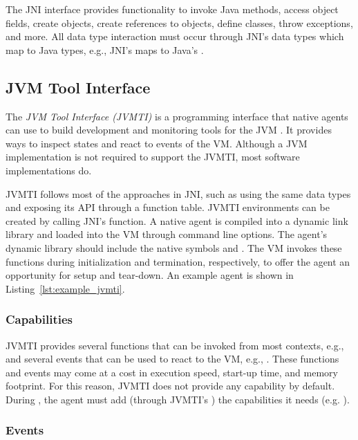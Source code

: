 The JNI interface provides functionality to invoke Java methods, access object fields, create objects, create references to objects, define classes, throw exceptions, and more. All data type interaction must occur through JNI's data types which map to Java types, e.g., JNI's  maps to Java's .

\subsection{JVM Tool Interface}

The \emph{JVM Tool Interface (JVMTI)} is a programming interface that native agents can use to build development and monitoring tools for the JVM \cite{jvmti}. It provides ways to inspect states and react to events of the VM. Although a JVM implementation is not required to support the JVMTI, most software implementations do.

JVMTI follows most of the approaches in JNI, such as using the same data types and exposing its API through a function table. JVMTI environments can be created by calling JNI's \href{https://docs.oracle.com/en/java/javase/11/docs/specs/jni/invocation.html#getenv}{} function. A native agent is compiled into a dynamic link library and loaded into the VM through command line options. The agent's dynamic library should include the native symbols  and . The VM invokes these functions during initialization and termination, respectively, to offer the agent an opportunity for setup and tear-down. An example agent is shown in Listing~\ref{lst:example_jvmti}.

\subsubsection*{Capabilities}

JVMTI provides several functions that can be invoked from most contexts, e.g.,  and several events that can be used to react to the VM, e.g., . These functions and events may come at a cost in execution speed, start-up time, and memory footprint. For this reason, JVMTI does not provide any capability by default. During , the agent must add (through JVMTI's ) the capabilities it needs (e.g. ).

\subsubsection*{Events}

